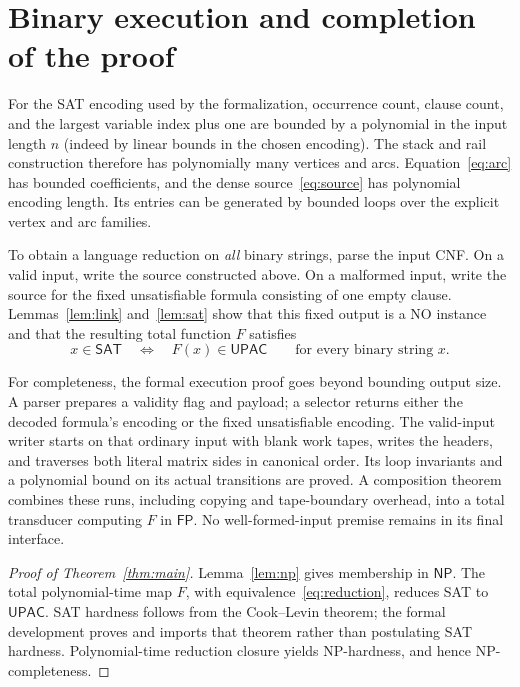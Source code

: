 \documentclass[11pt,a4paper]{article}
\newcommand{\NP}{\mathsf{NP}}
\newcommand{\FP}{\mathsf{FP}}
\newcommand{\UPAC}{\mathsf{UPAC}}
\newcommand{\SAT}{\mathsf{SAT}}
\begin{document}
\section{Binary execution and completion of the proof}
For the SAT encoding used by the formalization, occurrence count, clause
count, and the largest variable index plus one are bounded by a polynomial
in the input length $n$ (indeed by linear bounds in the chosen encoding).
The stack and rail construction therefore has polynomially many vertices
and arcs. Equation~\eqref{eq:arc} has bounded coefficients, and the dense
source~\eqref{eq:source} has polynomial encoding length. Its entries can be
generated by bounded loops over the explicit vertex and arc families.

To obtain a language reduction on \emph{all} binary strings, parse the
input CNF. On a valid input, write the source constructed above. On a
malformed input, write the source for the fixed unsatisfiable formula
consisting of one empty clause. Lemmas~\ref{lem:link} and~\ref{lem:sat}
show that this fixed output is a NO instance and that the resulting total
function $F$ satisfies
\begin{equation}\label{eq:reduction}
 x\in\SAT\quad\Longleftrightarrow\quad F(x)\in\UPAC
 \qquad\text{for every binary string }x.
\end{equation}

For completeness, the formal execution proof goes beyond bounding output
size. A parser prepares a validity flag and payload; a selector returns
either the decoded formula's encoding or the fixed unsatisfiable encoding.
The valid-input writer starts on that ordinary input with blank work tapes,
writes the headers, and traverses both literal matrix sides in canonical
order. Its loop invariants and a polynomial bound on its actual transitions
are proved. A composition theorem combines these runs, including copying
and tape-boundary overhead, into a total transducer computing $F$ in $\FP$.
No well-formed-input premise remains in its final interface.

\begin{proof}[Proof of Theorem~\ref{thm:main}]
Lemma~\ref{lem:np} gives membership in $\NP$. The total polynomial-time
map $F$, with equivalence~\eqref{eq:reduction}, reduces SAT to $\UPAC$.
SAT hardness follows from the Cook--Levin theorem; the formal development
proves and imports that theorem rather than postulating SAT hardness.
Polynomial-time reduction closure yields NP-hardness, and hence
NP-completeness.
\end{proof}
\end{document}
